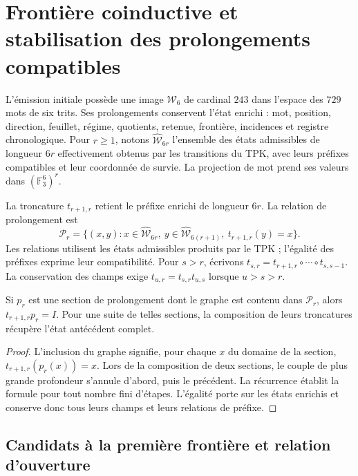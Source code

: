 \section{Frontière coinductive et stabilisation des prolongements compatibles}
\label{scope:g9-frontera}

L’émission initiale possède une image $\mathcal W_6$ de cardinal $243$ dans l’espace des $729$ mots de six trits. Ses prolongements conservent l’état enrichi : mot, position, direction, feuillet, régime, quotients, retenue, frontière, incidences et registre chronologique. Pour $r\ge1$, notons $\widehat{\mathcal W}_{6r}$ l’ensemble des états admissibles de longueur $6r$ effectivement obtenus par les transitions du TPK, avec leurs préfixes compatibles et leur coordonnée de survie. La projection de mot prend ses valeurs dans $(\mathbb F_3^6)^r$.

La troncature $t_{r+1,r}$ retient le préfixe enrichi de longueur $6r$. La relation de prolongement est
\[
 \mathcal P_r=\{(x,y):x\in\widehat{\mathcal W}_{6r},\
 y\in\widehat{\mathcal W}_{6(r+1)},\ t_{r+1,r}(y)=x\}.
\]
Les relations utilisent les états admissibles produits par le TPK ; l’égalité des préfixes exprime leur compatibilité. Pour $s>r$, écrivons $t_{s,r}=t_{r+1,r}\circ\cdots\circ t_{s,s-1}$. La conservation des champs exige $t_{u,r}=t_{s,r}t_{u,s}$ lorsque $u>s>r$.

\begin{proposition}
Si $p_r$ est une section de prolongement dont le graphe est contenu dans $\mathcal P_r$, alors $t_{r+1,r}p_r=I$. Pour une suite de telles sections, la composition de leurs troncatures récupère l’état antécédent complet.
\end{proposition}
\begin{proof}
L’inclusion du graphe signifie, pour chaque $x$ du domaine de la section, $t_{r+1,r}(p_r(x))=x$. Lors de la composition de deux sections, le couple de plus grande profondeur s’annule d’abord, puis le précédent. La récurrence établit la formule pour tout nombre fini d’étapes. L’égalité porte sur les états enrichis et conserve donc tous leurs champs et leurs relations de préfixe.
\end{proof}

\subsection{Candidats à la première frontière et relation d’ouverture}

